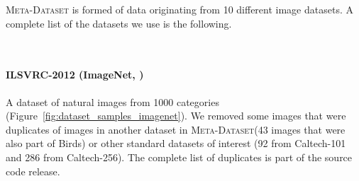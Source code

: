 \documentclass{article} \usepackage{iclr2020_conference,times}
\newcommand{\benchmark}{\textsc{Meta-Dataset}\xspace}
\begin{document}
\benchmark is formed of data originating from 10 different image datasets. A
complete list of the datasets we use is the following.

\begin{figure*}[htp]
  \centering
  \hspace{0.1cm}
  \hspace{0.1cm}
  \hspace{0.1cm}
  \hspace{0.1cm}
  \\
  \hspace{0.1cm}
  \hspace{0.1cm}
  \hspace{0.1cm}
  \hspace{0.1cm}
  \caption{\label{fig:dataset_samples} Training examples taken from the various datasets forming \benchmark.}
\end{figure*}

\paragraph{ILSVRC-2012 (ImageNet, \citealp{russakovsky2015imagenet})} A dataset of
natural images from 1000 categories (Figure~\ref{fig:dataset_samples_imagenet}).
We removed some images that were duplicates of images in another dataset in
\benchmark (43 images that were also part of Birds) or other standard datasets
of interest (92 from Caltech-101 and 286 from Caltech-256). The complete list
of duplicates is part of the source code release.
\end{document}
